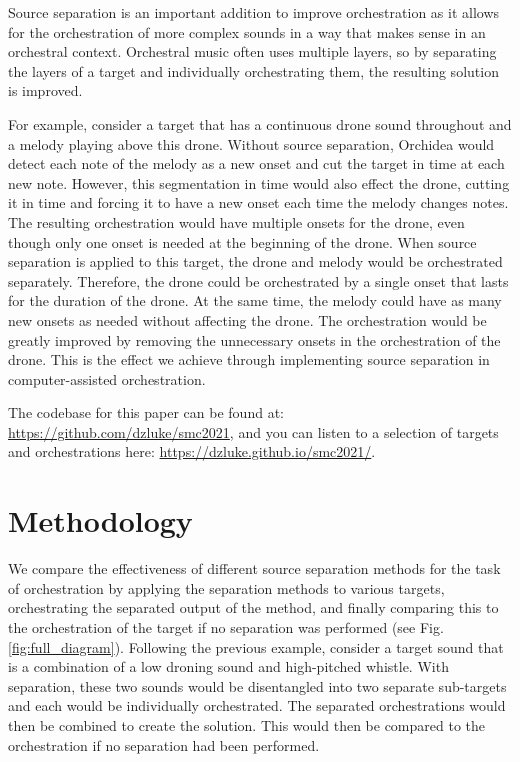 \documentclass{article}
\begin{document}
	Source separation is an important addition to improve orchestration as it allows for the orchestration of more complex sounds in a way that makes sense in an orchestral context. Orchestral music often uses multiple layers, so by separating the layers of a target and individually orchestrating them, the resulting solution is improved. 
		
	For example, consider a target that has a continuous drone sound throughout and a melody playing above this drone. Without source separation, Orchidea would detect each note of the melody as a new onset and cut the target in time at each new note. However, this segmentation in time would also effect the drone, cutting it in time and forcing it to have a new onset each time the melody changes notes. The resulting orchestration would have multiple onsets for the drone, even though only one onset is needed at the beginning of the drone. When source separation is applied to this target, the drone and melody would be orchestrated separately. Therefore, the drone could be orchestrated by a single onset that lasts for the duration of the drone. At the same time, the melody could have as many new onsets as needed without affecting the drone. The orchestration would be greatly improved by removing the unnecessary onsets in the orchestration of the drone. This is the effect we achieve through implementing source separation in computer-assisted orchestration.
		
	The codebase for this paper can be found at: \mbox{\url{https://github.com/dzluke/smc2021}}, and you can listen to a selection of targets and orchestrations here: \mbox{\url{https://dzluke.github.io/smc2021/}}.
		
	
	\section{Methodology}\label{sec:methodology}
	
	We compare the effectiveness of different source separation methods for the task of orchestration by applying the separation methods to various targets, orchestrating the separated output of the method, and finally comparing this to the orchestration of the target if no separation was performed (see Fig. \ref{fig:full_diagram}). Following the previous example, consider a target sound that is a combination of a low droning sound and high-pitched whistle. With separation, these two sounds would be disentangled into two separate sub-targets and each would be individually orchestrated. The separated orchestrations would then be combined to create the solution. This would then be compared to the orchestration if no separation had been performed.
	
\end{document}
